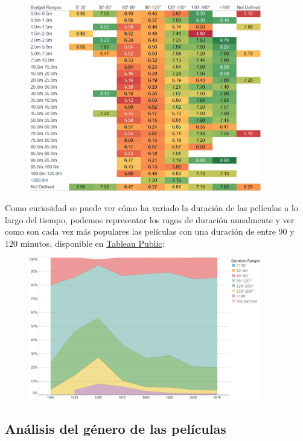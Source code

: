 \documentclass{article}
\begin{document}
\begin{figure}[h]
\centering
\includegraphics[width=4in,clip,keepaspectratio]{./images_latex/budget_duration}
\end{figure}

\clearpage

Como curiosidad se puede ver cómo ha variado la duración de las películas a lo largo del tiempo\cite{justgeek}, podemos representar los ragos de duración anualmente y ver como son cada vez más populares las películas con una duración de entre 90 y 120 minutos, disponible en \href{https://public.tableau.com/profile/javier6580\#!/vizhome/proyecto_fin_de_master_dataset/duration_year}{Tableau Public}:

\begin{figure}[h]
\centering
\includegraphics[width=4in,clip,keepaspectratio]{./images_latex/duration_year}
\end{figure}


\subsection{Análisis del género de las películas}
\end{document}
